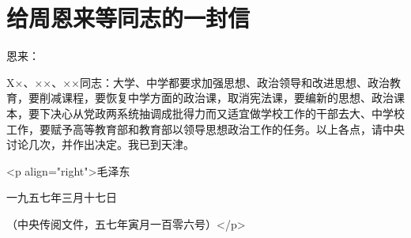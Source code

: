 \section[给周恩来等同志的一封信（一九五七年三月十七日）]{给周恩来等同志的一封信}


恩来：

X×、××、××同志：大学、中学都要求加强思想、政治领导和改进思想、政治教育，要削减课程，要恢复中学方面的政治课，取消宪法课，要编新的思想、政治课本，要下决心从党政两系统抽调成批得力而又适宜做学校工作的干部去大、中学校工作，要赋予高等教育部和教育部以领导思想政治工作的任务。以上各点，请中央讨论几次，并作出决定。我已到天津。

<p align="right">毛泽东

一九五七年三月十七日

（中央传阅文件，五七年寅月一百零六号）</p>


